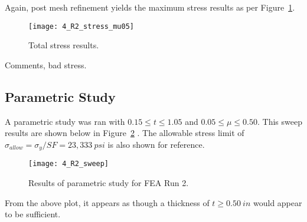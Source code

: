 Again, post mesh refinement yields the maximum stress results as per Figure~\ref{fig:4_R2_stress_mu05}.

\begin{figure}[H]
	\centering
	\texttt{[image: 4\_R2\_stress\_mu05]}
	\caption{Total stress results.}
	\label{fig:4_R2_stress_mu05}
\end{figure}

Comments, bad stress.


\subsection{Parametric Study}

A parametric study was ran with $0.15 \leq t \leq 1.05$ and $0.05 \leq \mu \leq 0.50$. This sweep results are shown below in Figure~\ref{fig:4_R2_sweep} \cite{EXCEL}. The allowable stress limit of $\sigma_{allow}=\sigma_{y}/SF = 23,333\ psi$ is also shown for reference.

\begin{figure}[H]
	\centering
	\texttt{[image: 4\_R2\_sweep]}
	\caption{Results of parametric study for FEA Run 2.}
	\label{fig:4_R2_sweep}
\end{figure}

From the above plot, it appears as though a thickness of $t \geq 0.50\ in$ would appear to be sufficient.


